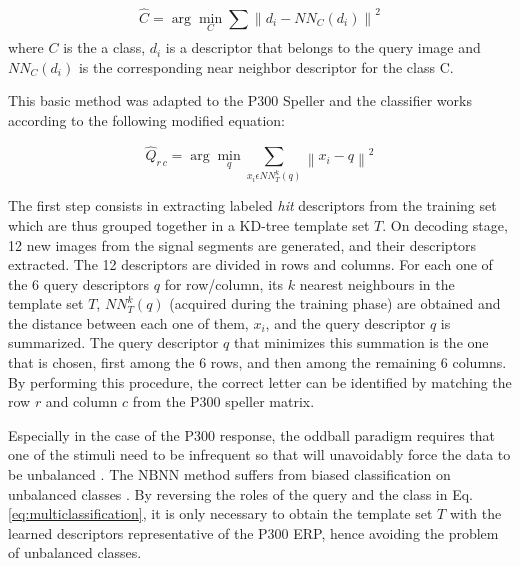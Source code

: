 \documentclass[entropy,article,submit,moreauthors,pdftex,10pt,a4paper]{mdpi}
\begin{document}
\begin{equation}
\hat{C} = \arg \min_C \sum_{}^{} \left\lVert d_i - NN_C(d_i) \right\rVert ^2
\label{eq:classification}
\end{equation}
where $C$ is the a class, $ d_i $ is a descriptor that belongs to the query image and $ NN_C(d_i) $ is the corresponding near neighbor descriptor for the class C.

This basic method was adapted to the P300 Speller and the classifier works according to the following modified equation:

\begin{equation}
\hat{Q}_{r\,c} = \arg \min_q \sum_{x_i \epsilon NN_T^k(q)}^{} \left\lVert x_i - q \right\rVert ^2
\label{eq:multiclassification}
\end{equation}

The first step consists in extracting labeled \textit{hit} descriptors from the training set which are thus grouped together in a KD-tree \citep{Vedaldi2010} template set $ T $.  On decoding stage, 12 new images from the signal segments are generated, and their descriptors extracted.  The 12 descriptors are divided in rows and columns.  For each one of the 6 query descriptors $ q $ for row/column, its $ k $ nearest neighbours in the template set $T$, $ NN_T^k(q) $ (acquired during the training phase)  are obtained and the distance between each one of them, $ x_i $, and the query descriptor $ q $ is summarized.  The query descriptor $ q $ that minimizes this summation is the one that is chosen, first among the 6 rows, and then among the remaining 6 columns.  By performing this procedure, the correct letter can be identified by matching the row $ r $ and column $ c $ from the P300 speller matrix.   

Especially in the case of the P300 response, the oddball paradigm requires that one of the stimuli need to be infrequent so that will unavoidably force the data to be unbalanced \citep{Tibon2015}.  The NBNN method suffers from biased classification on unbalanced classes \citep{Fornoni2014}.  By reversing the roles of the query and the class in Eq. \ref{eq:multiclassification}, it is only necessary to obtain the template set $ T $ with the learned descriptors representative of the P300 ERP, hence avoiding the problem of unbalanced classes.
\end{document}
